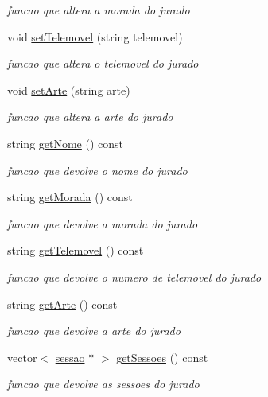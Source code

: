 \begin{DoxyCompactItemize}
\begin{DoxyCompactList}\small\item\em funcao que altera a morada do jurado \end{DoxyCompactList}\item 
void \hyperlink{classjurado_abb5ebbc58c0dc5379e47673d4695ac70}{set\+Telemovel} (string telemovel)
\begin{DoxyCompactList}\small\item\em funcao que altera o telemovel do jurado \end{DoxyCompactList}\item 
void \hyperlink{classjurado_a8e33ffaa864e0cbb645e65e0b571d000}{set\+Arte} (string arte)
\begin{DoxyCompactList}\small\item\em funcao que altera a arte do jurado \end{DoxyCompactList}\item 
string \hyperlink{classjurado_a02bb9270bf2d86644017814317546456}{get\+Nome} () const 
\begin{DoxyCompactList}\small\item\em funcao que devolve o nome do jurado \end{DoxyCompactList}\item 
string \hyperlink{classjurado_ac5843b1f1e60196e5fa4697c5e6c897a}{get\+Morada} () const 
\begin{DoxyCompactList}\small\item\em funcao que devolve a morada do jurado \end{DoxyCompactList}\item 
string \hyperlink{classjurado_aa48845847fcb0cf892c0f324ca95934f}{get\+Telemovel} () const 
\begin{DoxyCompactList}\small\item\em funcao que devolve o numero de telemovel do jurado \end{DoxyCompactList}\item 
string \hyperlink{classjurado_a300946cb2a34dec4b688d76a002c6e3f}{get\+Arte} () const 
\begin{DoxyCompactList}\small\item\em funcao que devolve a arte do jurado \end{DoxyCompactList}\item 
vector$<$ \hyperlink{classsessao}{sessao} $\ast$ $>$ \hyperlink{classjurado_a3bc8171a54abd5d01413fa12fb3b388a}{get\+Sessoes} () const 
\begin{DoxyCompactList}\small\item\em funcao que devolve as sessoes do jurado \end{DoxyCompactList}\item 

\end{DoxyCompactItemize}
